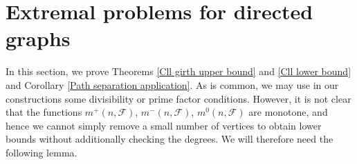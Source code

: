 \documentclass[12pt]{article}
\def\john#1{\noindent
\textcolor{green}
{\textsc{(John:}
\textsf{#1})}}
\begin{document}

\section{Extremal problems for directed graphs}

In this section, we prove Theorems \ref{Cll girth upper bound} and \ref{Cll lower bound} and Corollary \ref{Path separation application}.  As is common, we may use in our constructions some divisibility or prime factor conditions.  However, it is not clear that the functions $m^+(n, \mathcal{F})$, $m^-(n, \mathcal{F})$, $m^0(n, \mathcal{F})$ are monotone, and hence we cannot simply remove a small number of vertices to obtain lower bounds without additionally checking the degrees. We will therefore need the following lemma.
\end{document}
